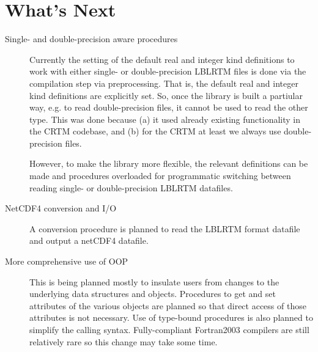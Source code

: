 \chapter*{What's Next}

\begin{description}
\item[Single- and double-precision aware procedures] Currently the setting of the default real and integer kind definitions to work with either single- or double-precision LBLRTM files is done via the compilation step via preprocessing. That is, the default real and integer kind definitions are explicitly set. So, once the library is built a partiular way, e.g. to read double-precision files, it cannot be used to read the other type. This was done because (a) it used already existing functionality in the CRTM codebase, and (b) for the CRTM at least we always use double-precision files.

However, to make the library more flexible, the relevant definitions can be made and procedures overloaded for programmatic switching between reading single- or double-precision LBLRTM datafiles.


\item[NetCDF4 conversion and I/O] A conversion procedure is planned to read the LBLRTM format datafile and output a netCDF4 datafile.

 
\item[More comprehensive use of OOP] This is being planned mostly to insulate users from changes to the underlying data structures and objects. Procedures to get and set attributes of the various objects are planned so that direct access of those attributes is not necessary. Use of type-bound procedures is also planned to simplify the calling syntax. Fully-compliant Fortran2003 compilers are still relatively rare so this change may take some time.

\end{description}
